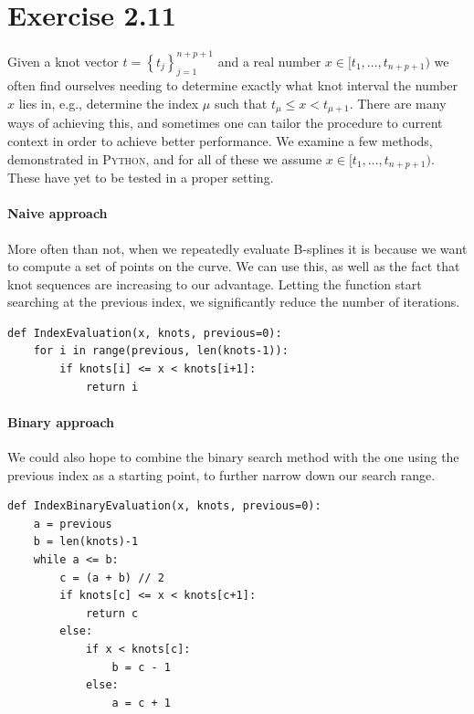 \documentclass[a4paper]{article}
\begin{document}
    \section*{Exercise 2.11}
    \label{sec:exercise_2_11}

    Given a knot vector $t = \left\{ t_j \right\}_{j=1}^{n+p+1}$ and a real
    number $x \in [t_1, \ldots, t_{n+p+1})$ we often find ourselves needing to
    determine exactly what knot interval the number $x$ lies in, e.g.,
    determine the index $\mu$ such that $t_\mu \leq x < t_{\mu+1}$. There are
    many ways of achieving this, and sometimes one can tailor the procedure to
    current context in order to achieve better performance. We examine a few
    methods, demonstrated in \textsc{Python}, and for all of these we assume $x
    \in [t_1, \ldots, t_{n+p+1})$. These have yet to be tested in a proper
    setting.

    \paragraph{Naive approach}
    \label{par:evaluation_approach}
    More often than not, when we repeatedly evaluate B-splines it is because we
    want to compute a set of points on the curve. We can use this, as well as
    the fact that knot sequences are increasing to our advantage. Letting the
    function start searching at the previous index, we significantly reduce the
    number of iterations.
    \begin{verbatim}
def IndexEvaluation(x, knots, previous=0):
    for i in range(previous, len(knots-1)):
        if knots[i] <= x < knots[i+1]:
            return i
    \end{verbatim}

    \paragraph{Binary approach}
    \label{par:binary_evaluation_approach}

    We could also hope to combine the binary search method with the one using
    the previous index as a starting point, to further narrow down our search
    range. 
    
    \begin{verbatim}
def IndexBinaryEvaluation(x, knots, previous=0):
    a = previous
    b = len(knots)-1
    while a <= b:
        c = (a + b) // 2
        if knots[c] <= x < knots[c+1]:
            return c
        else:
            if x < knots[c]:
                b = c - 1
            else:
                a = c + 1
    \end{verbatim}
\end{document}
